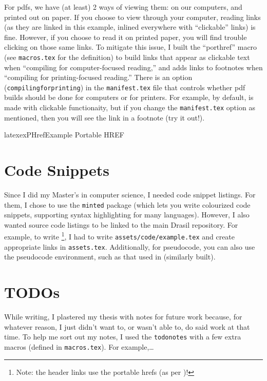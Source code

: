 For \acsp{pdf}, we have (at least) 2 ways of viewing them: on our computers, and
printed out on paper. If you choose to view through your computer, reading links
(as they are linked in this example, inlined everywhere with ``clickable''
links) is fine. However, if you choose to read it on printed paper, you will
find trouble clicking on those same links. To mitigate this issue, I built the
``porthref'' macro (see \texttt{macros.tex} for the definition) to build links
that appear as clickable text when ``compiling for computer-focused reading,''
and adds links to footnotes when ``compiling for printing-focused reading.''
There is an option (\texttt{compilingforprinting}) in the \texttt{manifest.tex}
file that controls whether \acs{pdf} builds should be done for computers or for
printers. For example, by default, 
is made with clickable functionaity, but if you change the \texttt{manifest.tex}
option as mentioned, then you will see the link in a footnote (try it out!).


\begin{pseudocode}{latex}{exPHref}{Example Portable HREF}
\end{pseudocode}

\section{Code Snippets}
\label{chap:extras:sec:code-snippets}

Since I did my Master's in computer science, I needed code snippet listings. For
them, I chose to use the \texttt{minted} package (which lets you write
colourized code snippets, supporting syntax highlighting for many languages).
However, I also wanted source code listings to be linked to the main Drasil
\cite{carette_drasil_2021} repository. For example, to write
\footnote{Note: the header links use the portable \acsp{href}
    (as per )!}, I had to write
\texttt{assets/code/example.tex} and create appropriate links in
\texttt{assets.tex}. Additionally, for pseudocode, you can also use the
pseudocode environment, such as that used in  (similarly
built).

\section{TODOs}
\label{chap:extras:sec:todos}

While writing, I plastered my thesis with notes for future work because, for
whatever reason, I just didn't want to, or wasn't able to, do said work at that
time. To help me sort out my notes, I used the \texttt{todonotes}
 with a few extra
macros (defined in \texttt{macros.tex}). For example,\ldots{}

